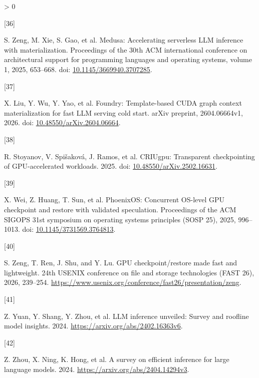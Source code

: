 \documentclass[UTF8,10.5pt,fontset=windows]{ctexart}
\newlength{\cslhangindent}
\newlength{\csllabelwidth}
\newenvironment{CSLReferences}[2] %
 {%
  \setlength{\parindent}{0pt}
  \ifodd #1 \everypar{\setlength{\hangindent}{\cslhangindent}}\ignorespaces\fi
  \ifnum #2 > 0
  \setlength{\parskip}{#2\baselineskip}
  \fi
 }%
 {}
\newcommand{\CSLLeftMargin}[1]{\parbox[t]{\csllabelwidth}{#1}}
\newcommand{\CSLRightInline}[1]{\parbox[t]{\linewidth - \csllabelwidth}{#1}\break}
\begin{document}
\begin{CSLReferences}{0}{0}
\leavevmode{}%
\CSLLeftMargin{{[}36{]} }
\CSLRightInline{S. Zeng, M. Xie, S. Gao, et al. Medusa: Accelerating
serverless LLM inference with materialization. Proceedings of the 30th
ACM international conference on architectural support for programming
languages and operating systems, volume 1, 2025, 653--668. doi:
\href{https://doi.org/10.1145/3669940.3707285}{10.1145/3669940.3707285}.}

\leavevmode{}%
\CSLLeftMargin{{[}37{]} }
\CSLRightInline{X. Liu, Y. Wu, Y. Yao, et al. Foundry: Template-based
CUDA graph context materialization for fast LLM serving cold start.
arXiv preprint, 2604.06664v1, 2026. doi:
\href{https://doi.org/10.48550/arXiv.2604.06664}{10.48550/arXiv.2604.06664}.}

\leavevmode{}%
\CSLLeftMargin{{[}38{]} }
\CSLRightInline{R. Stoyanov, V. Spišaková, J. Ramos, et al. CRIUgpu:
Transparent checkpointing of GPU-accelerated workloads. 2025. doi:
\href{https://doi.org/10.48550/arXiv.2502.16631}{10.48550/arXiv.2502.16631}.}

\leavevmode{}%
\CSLLeftMargin{{[}39{]} }
\CSLRightInline{X. Wei, Z. Huang, T. Sun, et al. PhoenixOS: Concurrent
OS-level GPU checkpoint and restore with validated speculation.
Proceedings of the ACM SIGOPS 31st symposium on operating systems
principles (SOSP 25), 2025, 996--1013. doi:
\href{https://doi.org/10.1145/3731569.3764813}{10.1145/3731569.3764813}.}

\leavevmode{}%
\CSLLeftMargin{{[}40{]} }
\CSLRightInline{S. Zeng, T. Ren, J. Shu, and Y. Lu. GPU
checkpoint/restore made fast and lightweight. 24th USENIX conference on
file and storage technologies (FAST 26), 2026, 239--254.
\url{https://www.usenix.org/conference/fast26/presentation/zeng}.}

\leavevmode{}%
\CSLLeftMargin{{[}41{]} }
\CSLRightInline{Z. Yuan, Y. Shang, Y. Zhou, et al. LLM inference
unveiled: Survey and roofline model insights. 2024.
\url{https://arxiv.org/abs/2402.16363v6}.}

\leavevmode{}%
\CSLLeftMargin{{[}42{]} }
\CSLRightInline{Z. Zhou, X. Ning, K. Hong, et al. A survey on efficient
inference for large language models. 2024.
\url{https://arxiv.org/abs/2404.14294v3}.}


\end{CSLReferences}
\end{document}
